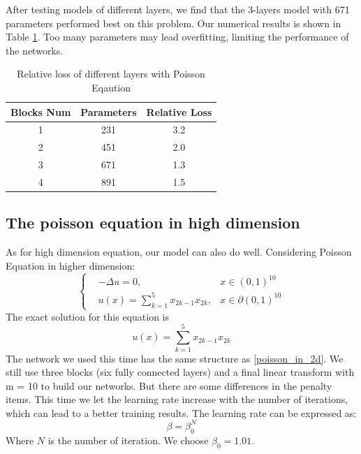 \documentclass{article}
\begin{document}
\par After testing models of different layers, we find that the 3-layers model with 671 parameters performed best on this problem. Our numerical results is shown in Table \ref{different layers of poisson equation}. Too many parameters may lead overfitting, limiting the performance of the networks.

\begin{table}[htbp]
\centering  
\caption{Relative loss of different layers with Poisson Eqaution}
\label{different layers of poisson equation}
\begin{tabular}{ccc} 
	\toprule  %
	Blocks Num & Parameters & Relative Loss\\
	\hline
	1 & 231 & 3.2\\
	\hline
	2 & 451 & 2.0\\
	\hline
	3 & 671 & 1.3\\
	\hline
	4 & 891 & 1.5\\
	\bottomrule %
\end{tabular}
\end{table}


\subsection{The poisson equation in high dimension}
As for high dimension equation, our model can also do well. Considering Poisson Equation in higher dimension:
\begin{equation}
\left \{
\begin{aligned}
&-\Delta u =0, &x\in (0,1)^{10} \\
&u(x)=\sum\limits_{k=1}^5x_{2k-1}x_{2k}, &x\in \partial (0,1)^{10}
\end{aligned}
\right.
\end{equation}
The exact solution for this equation is 
\begin{equation}
u(x)=\sum\limits_{k=1}^5x_{2k-1}x_{2k}
\end{equation}
The network we used this time has the same structure as \ref{poisson_in_2d}. We still use three blocks (six fully connected layers) and a final linear transform with m = 10 to build our networks. But there are some differences in the penalty items. This time we let the learning rate increase with the number of iterations, which can lead to a better training results. The learning rate can be expressed as:
\begin{equation}
\beta=\beta_{0}^N
\end{equation}
Where $N$ is the number of iteration. We choose $\beta_0=1.01$.
\end{document}
